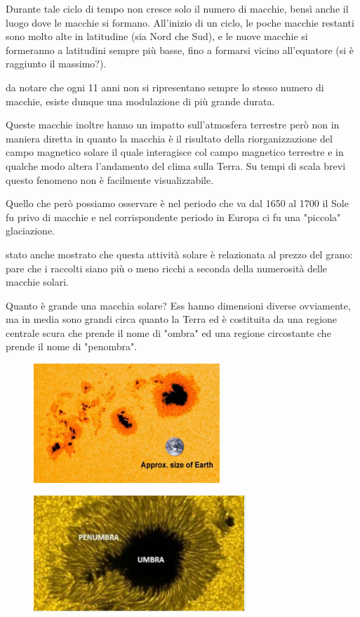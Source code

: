 Durante tale ciclo di tempo non cresce solo il numero di macchie, bensì anche il luogo dove le macchie si formano. All'inizio di un ciclo, le poche macchie restanti sono molto alte in latitudine (sia Nord che Sud), e le nuove macchie si formeranno a latitudini sempre più basse, fino a formarsi vicino all'equatore (si è raggiunto il massimo?).

\E da notare che ogni 11 anni non si ripresentano sempre lo stesso numero di macchie, esiste dunque una modulazione di più grande durata.

Queste macchie inoltre hanno un impatto sull'atmosfera terrestre però non in maniera diretta in quanto la macchia è il risultato della riorganizzazione del campo magnetico solare il quale interagisce col campo magnetico terrestre e in qualche modo altera l'andamento del clima sulla Terra. Su tempi di scala brevi questo fenomeno non è facilmente visualizzabile.

Quello che però possiamo osservare è nel periodo che va dal 1650 al 1700 il Sole fu privo di macchie e nel corrispondente periodo in Europa ci fu una "piccola" glaciazione.

\E stato anche mostrato che questa attività solare è relazionata al prezzo del grano: pare che i raccolti siano più o meno ricchi a seconda della numerosità delle macchie solari.

Quanto è grande una macchia solare? Ess hanno dimensioni diverse ovviamente, ma in media sono grandi circa quanto la Terra ed è costituita da una regione centrale scura che prende il nome di "ombra" ed una regione circostante che prende il nome di "penombra".

\begin{minipage}{0.45\textwidth}
    \begin{figure}[H]
        \centering
        \includegraphics[width=7cm]{2dic/FormaeDimensioneMacchia.jpg} 
    \end{figure}
\end{minipage}
\begin{minipage}{0.55\textwidth}
    \begin{figure}[H]
        \centering
        \includegraphics[width=8cm]{2dic/ZoneMacchia.jpg}
    \end{figure}
\end{minipage}

